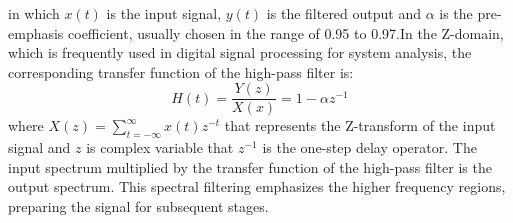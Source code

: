 in which $x(t)$ is the input signal, $y(t)$ is the filtered output and  $\alpha$  is the pre-emphasis coefficient, usually chosen in the range of 0.95 to 0.97.In the Z-domain, which is frequently used in digital signal processing for system analysis, the corresponding transfer function of the high-pass filter is:\\
\begin{equation}
H(t)=\frac{Y(z)}{X(x)}=1-\alpha z^{-1}
\end{equation}
where $X(z)=\sum_{t=-\infty}^{\infty}x(t)z^{-t}$ that represents the Z-transform of the input signal and $z$ is complex variable that $z^{-1}$ is the one-step delay operator. The input spectrum multiplied by the transfer function of the high-pass filter is the output spectrum. This spectral filtering emphasizes the higher frequency regions, preparing the signal for subsequent stages. \\
